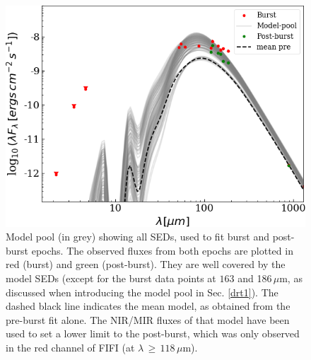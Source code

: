 \begin{appendix}
\begin{figure}
    \sidecaption
	\includegraphics[width=12cm]{G358_ap3_modelpool_obs.png}
	\caption{Model pool (in grey) showing all SEDs, used to fit burst and post-burst epochs. The observed fluxes from both epochs are plotted in red (burst) and green (post-burst). They are well covered by the model SEDs (except for the burst data points at $163$ and 186\,$\mu$m, as discussed when introducing the model pool in Sec. \ref{drt1}). The dashed black line indicates the mean model, as obtained from the pre-burst fit alone. The NIR/MIR fluxes of that model have been used to set a lower limit to the post-burst, which was only observed in the red channel of FIFI (at $\lambda\,{\ge}\,118\,\mu$m).} 
 \label{fig:sed g358 modelpool}
\end{figure}


\clearpage


\end{appendix}
